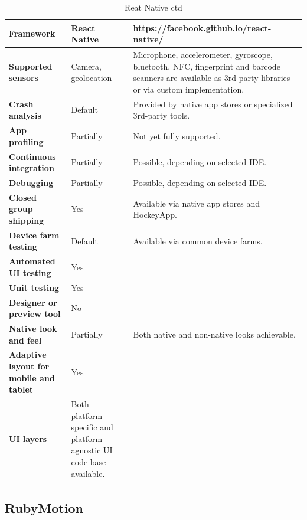 \documentclass[english,master,public,dept460,male,cpdeclaration,oneside]{diploma}
\begin{document}
\begin{table}[!h]
	\centering
	\caption{Reat Native ctd}
	\begin{tabular}{p{} | p{} | p{}}
		\toprule		
		\textbf{Framework} & \textbf{React Native} & https://facebook.github.io/react-native/ \\
		\midrule
		\textbf{Supported sensors} & Camera, geolocation & Microphone, accelerometer, gyroscope, bluetooth, NFC, fingerprint and barcode scanners are available as 3rd party libraries or via custom implementation. \\			
		\midrule
		\textbf{Crash analysis} & Default & Provided by native app stores or specialized 3rd-party tools. \\			
		\midrule
		\textbf{App profiling} & Partially & Not yet fully supported. \\			
		\midrule
		\textbf{Continuous integration} & Partially & Possible, depending on selected IDE. \\			
		\midrule
		\textbf{Debugging} & Partially & Possible, depending on selected IDE. \\			
		\midrule
		\textbf{Closed group shipping} & Yes & Available via native app stores and HockeyApp. \\			
		\midrule
		\textbf{Device farm testing} & Default & Available via common device farms. \\			
		\midrule
		\textbf{Automated UI testing} & Yes & \\			
		\midrule
		\textbf{Unit testing} & Yes & \\			
		\midrule
		\textbf{Designer or preview tool} & No & \\			
		\midrule
		\textbf{Native look and feel} & Partially & Both native and non-native looks achievable. \\			
		\midrule
		\textbf{Adaptive layout for mobile and tablet} & Yes & \\			
		\midrule		
		\textbf{UI layers} & Both platform-specific and platform-agnostic UI code-base available. & \\			
		\midrule
	\end{tabular}
\end{table}

\clearpage
\subsection{RubyMotion}
\end{document}
